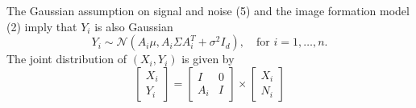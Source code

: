 \documentclass{article}
\begin{document}
The Gaussian assumption on signal and noise (5) and the image formation model (2) imply that $Y_i$ is also Gaussian
\begin{equation}
Y_i \sim \mathcal{N}(A_i \mu, A_i \Sigma A_i^T + \sigma^2 I_d),\quad \text{for } i=1,\ldots,n.
\end{equation} 
The joint distribution of $(X_i, Y_i)$ is given by
\begin{equation}
 \left[\begin{array}{c} X_i \\ Y_i \end{array}\right] = 
\begin{bmatrix} I & 0 \\ A_i & I \end{bmatrix} \times \left[ \begin{array}{c} X_i \\ N_i \end{array} \right]      
\end{equation}
\end{document}
